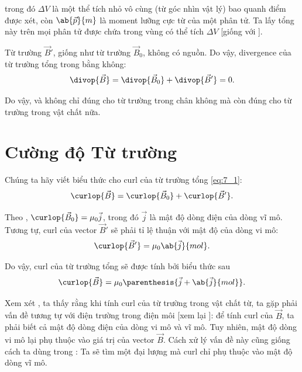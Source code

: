 \noindent
trong đó $\Delta{V}$ là một thể tích nhỏ vô cùng (từ góc nhìn vật lý) bao quanh điểm được xét, còn $\ab{\vec{p}}{m}$ là moment lưỡng cực từ của một phân tử.
Ta lấy tổng này trên mọi phân tử được chứa trong vùng có thể tích $\Delta{V}$ [giống với ].

Từ trường $\vec{B}'$, giống như từ trường $\vec{B}_0$, không có nguồn.
Do vậy, divergence của từ trường tổng trong  bằng không:
\begin{equation}\label{eq:7_3}
    \divop{\vec{B}} = \divop{\vec{B}_0} + \divop{\vec{B}'} = 0.
\end{equation}

\noindent
Do vậy,  và  không chỉ đúng cho từ trường trong chân không mà còn đúng cho từ trường trong vật chất nữa.

\section{Cường độ Từ trường}\label{sec:7_2}

Chúng ta hãy viết biểu thức cho curl của từ trường tổng \eqref{eq:7_1}:
\begin{equation*}
    \curlop{\vec{B}} = \curlop{\vec{B}_0} + \curlop{\vec{B}'}.
\end{equation*}

\noindent
Theo , $\curlop{\vec{B}_0}=\mu_0\vec{j}$, trong đó $\vec{j}$ là mật độ dòng điện của dòng vĩ mô.
Tương tự, curl của vector $\vec{B}'$ sẽ phải tỉ lệ thuận với mật độ của dòng vi mô:
\begin{equation*}
    \curlop{\vec{B}'} = \mu_0 \ab{\vec{j}}{mol}.
\end{equation*}

\noindent
Do vậy, curl của từ trường tổng sẽ được tính bởi biểu thức sau
\begin{equation}\label{eq:7_4}
    \curlop{\vec{B}} = \mu_0 \parenthesis{\vec{j} + \ab{\vec{j}}{mol}}.
\end{equation}

Xem xét , ta thấy rằng khi tính curl của từ trường trong vật chất từ, ta gặp phải vấn đề tương tự với điện trường trong điện môi [xem lại ]: để tính curl của $\vec{B}$, ta phải biết cả mật độ dòng điện của dòng vi mô và vĩ mô.
Tuy nhiên, mật độ dòng vi mô lại phụ thuộc vào giá trị của vector $\vec{B}$.
Cách xử lý vấn đề này cũng giống cách ta dùng trong : Ta sẽ tìm một đại lượng mà curl chỉ phụ thuộc vào mật độ dòng vĩ mô.

